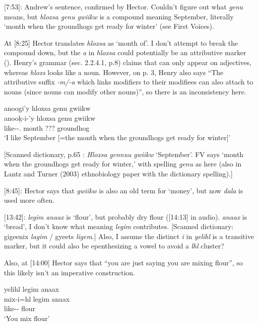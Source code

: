 [7:53]: Andrew's sentence, confirmed by Hector. Couldn't figure out what \textit{g̱enu} means, but \textit{hloxsa g̱enu gwiikw} is a compound meaning September, literally `month when the groundhogs get ready for winter' (see First Voices).

At [8:25] Hector translates \textit{hloxsa} as `month of'. I don't attempt to break the compound down, but the \textit{a} in \textit{hloxsa} could potentially be an attributive marker (\Attr{}). Henry's grammar (sec. 2.2.4.1, p.8) claims that \Attr{} can only appear on adjectives, whereas \textit{hloxs} looks like a noun. However, on p. 3, Henry also says ``The attributive suffix \textit{-m/-a} which links modifiers to their modifiees can also attach to nouns (since nouns can modify other nouns)'', so there is an inconsistency here.

\begin{exe}
    \ex \glll anoog̱i'y hloxsa g̱enu gwiikw \\
    anooḵ-i-'y hloxsa g̱enu gwiikw \\
    like-\Tr{}-\Fsg.\Ii{} month ??? groundhog\\
    `I like September [=the month when the groundhogs get ready for winter]'
\end{exe}

[Scanned dictionary, p.65 : \textit{Hloxsa g̱ennuu gwiikw} `September'. FV says `month when the groundhogs get ready for winter,' with spelling \textit{g̱enu} as here (also in Lantz and Turner (2003) ethnobiology paper with the dictionary spelling).]

[8:45]: Hector says that \textit{gwiikw} is also an old term for `money', but now \textit{dala} is used more often.

[13:42]: \textit{legim anaax} is `flour', but probably dry flour ([14:13] in audio). \textit{anaax} is `bread', I don't know what meaning \textit{legim} contributes. [Scanned dictionary:  gigeenix \textit{lagim} / gyeets \textit{ligem}.] Also, I assume the distinct \textit{i} in \textit{yelihl} is a transitive marker, but it could also be epenthesizing a vowel to avoid a \textit{lhl} cluster?

Also, at [14:00] Hector says that ``you are just saying you are mixing flour'', so this likely isn't an imperative construction.

\begin{exe}
    \ex \glll yelihl legim anaax \\
    mix-i=hl legim anaax \\
    like-\Tr{}-\Cn{} flour \\
    `You mix flour'
\end{exe}

